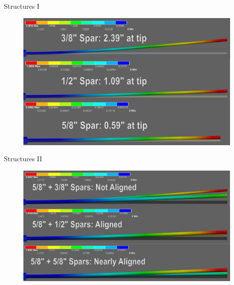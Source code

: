 \documentclass{beamer}
\begin{document}
    \begin{frame}{Structures I} %
        \begin{figure}[htbp]
            \centering
            \includegraphics[width=\textwidth]{figures/Structures I Conglomerate.png}
        \end{figure}
    \end{frame}

    \begin{frame}{Structures II} %
        \begin{figure}[htbp]
            \centering
            \includegraphics[width=\textwidth]{figures/Structures II Conglomerate.png}
        \end{figure}
    \end{frame}
\end{document}
